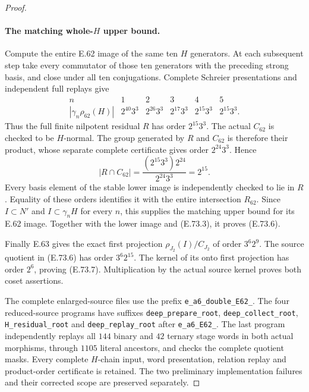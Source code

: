 \begin{proof}
\paragraph{The matching whole-$H$ upper bound.}
Compute the entire E.62 image of the same ten $H$
generators. At each subsequent step take every
commutator of those ten generators with the preceding
strong basis, and close under all ten conjugations.
Complete Schreier presentations and independent full
replays give
\[
 \begin{array}{c|ccccc}
 n&1&2&3&4&5\\\hline
 |\gamma_n\rho_{62}(H)|
   &2^{40}3^3&2^{26}3^3&2^{17}3^3&2^{15}3^3&2^{15}3^3.
 \end{array}
 \tag{E.73.12}
\]
Thus the full finite nilpotent residual $R$ has order
$2^{15}3^3$. The actual $C_{62}$ is checked to be
$H$-normal. The group generated by $R$ and $C_{62}$
is therefore their product, whose separate complete
certificate gives order $2^{24}3^3$. Hence
\[
 |R\cap C_{62}|=
 \frac{(2^{15}3^3)2^{24}}{2^{24}3^3}=2^{15}.
 \tag{E.73.13}
\]
Every basis element of the stable lower image is
independently checked to lie in $R$. Equality of these
orders identifies it with the entire intersection
$R_{62}$. Since $I\subset N'$ and $I\subset\gamma_nH$
for every $n$, this supplies the matching upper bound
for its E.62 image. Together with the lower image and
(E.73.3), it proves (E.73.6).

Finally E.63 gives the exact first projection
$\rho_{J_2}(I)/C_{J_2}$ of order $3^6 2^9$.
The source quotient in (E.73.6) has order $3^6 2^{15}$.
The kernel of its onto first projection has order
$2^6$, proving (E.73.7). Multiplication by the actual
source kernel proves both coset assertions.

The complete enlarged-source files use the prefix
\texttt{e\_a6\_double\_E62\_}. The four reduced-source
programs have suffixes \texttt{deep\_prepare\_root},
\texttt{deep\_collect\_root}, \texttt{H\_residual\_root}
and \texttt{deep\_replay\_root} after
\texttt{e\_a6\_E62\_}. The last program independently
replays all $144$ binary and $42$ ternary stage words
in both actual morphisms, through $1105$ literal
ancestors, and checks the complete quotient masks.
Every complete $H$-chain input, word presentation,
relation replay and product-order certificate is
retained. The two preliminary implementation failures
and their corrected scope are preserved separately.
\end{proof}
